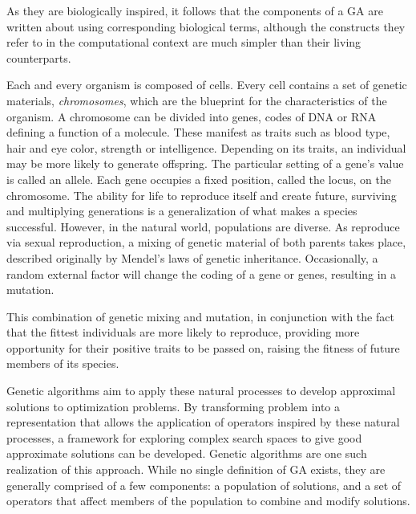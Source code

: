 As they are biologically inspired, it follows that the components of a GA are written about using corresponding biological terms, although the constructs they refer to in the computational context are much simpler than their living counterparts.

Each and every organism is composed of cells. Every cell contains a set of genetic materials, \textit{chromosomes}, which are the blueprint for the characteristics of the organism. A chromosome can be divided into genes, codes of DNA or RNA defining a function of a molecule. These manifest as traits such as blood type, hair and eye color, strength or intelligence. Depending on its traits, an individual may be more likely to generate offspring. The particular setting of a gene's value is called an allele. Each gene occupies a fixed position, called the locus, on the chromosome. The ability for life to reproduce itself and create future, surviving and multiplying generations is a generalization of what makes a species successful. However, in the natural world, populations are diverse. As reproduce via sexual reproduction, a mixing of genetic material of both parents takes place, described originally by Mendel's laws of genetic inheritance. Occasionally, a random external factor will change the coding of a gene or genes, resulting in a mutation.

This combination of genetic mixing and mutation, in conjunction with the fact that the fittest individuals are more likely to reproduce, providing more opportunity for their positive traits to be passed on, raising the fitness of future members of its species. 
  
Genetic algorithms aim to apply these natural processes to develop approximal solutions to optimization problems. By transforming problem into a representation that allows the application of operators inspired by these natural processes, a framework for exploring complex search spaces to give good approximate solutions can be developed. Genetic algorithms are one such realization of this approach. While no single definition of GA exists, they are generally comprised of a few components: a population of solutions, and a set of operators that affect members of the population to combine and modify solutions.

